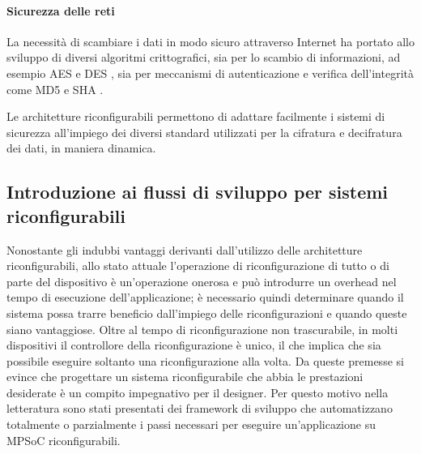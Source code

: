 \paragraph{Sicurezza delle reti}
La necessità di scambiare i dati in modo sicuro attraverso Internet ha portato allo sviluppo
di diversi algoritmi crittografici, sia per lo scambio di informazioni, ad esempio
\ac{AES} \cite{AESFPGA} e \ac{DES} \cite{DESFPGA}, sia per meccanismi di autenticazione e verifica dell'integrità come
MD5 \cite{MD5FPGA} e \ac{SHA} \cite{SHA256FPGA}.

Le architetture riconfigurabili permettono di adattare facilmente i sistemi di sicurezza
all'impiego dei diversi standard utilizzati per la cifratura e decifratura dei dati, in
maniera dinamica.


\subsection{Introduzione ai flussi di sviluppo per sistemi riconfigurabili}
\label{subsec:introFlussi}
Nonostante gli indubbi vantaggi derivanti dall'utilizzo delle architetture riconfigurabili,
allo stato attuale l'operazione di riconfigurazione di tutto o di parte del dispositivo \`e
un'operazione onerosa e pu\`o introdurre un overhead nel tempo di esecuzione dell'applicazione;
\`e necessario quindi determinare quando il sistema possa trarre beneficio dall'impiego delle
riconfigurazioni e quando queste siano vantaggiose. Oltre al tempo di riconfigurazione non trascurabile,
in molti dispositivi il controllore della riconfigurazione \`e unico, il che implica che sia possibile
eseguire soltanto una riconfigurazione alla volta.
Da queste premesse si evince che progettare un sistema riconfigurabile che abbia le prestazioni desiderate
\`e un compito impegnativo per il designer. Per questo motivo nella letteratura sono stati presentati dei framework
di sviluppo che automatizzano totalmente o parzialmente i passi necessari per eseguire un'applicazione
su MPSoC riconfigurabili.

